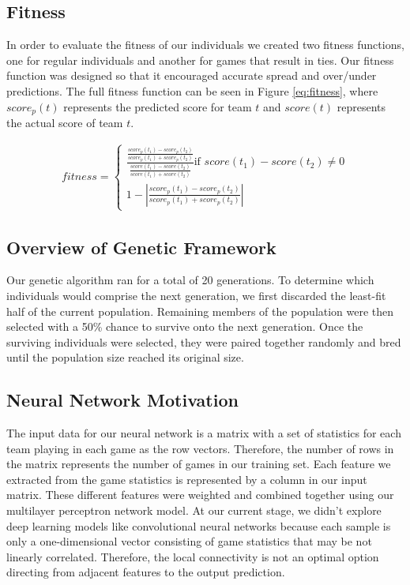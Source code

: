 \documentclass[10pt,twocolumn,letterpaper]{article}
\begin{document}
\subsection{Fitness}
In order to evaluate the fitness of our individuals we created two fitness functions, one for regular individuals and another for games that result in ties.  Our fitness function was designed so that it encouraged accurate spread and over/under predictions.  The full fitness function can be seen in Figure \ref{eq:fitness}, where $score_p(t)$ represents the predicted score for team $t$ and $score(t)$ represents the actual score of team $t$.
\begin{small}
\begin{align*}
fitness = 
\begin{cases}
\frac{\frac{score_p(t_1) - score_p(t_2)}{score_p(t_1) + score_p(t_2)}}{\frac{score(t_1) - score(t_2)}{score(t_1) + score(t_2)}}\textrm{if } score(t_1) - score(t_2) \neq 0\\
1 - \left|\frac{score_p(t_1) - score_p(t_2)}{score_p(t_1) + score_p(t_2)}\right|
\end{cases}
\end{align*}
\end{small}
\begingroup\vspace*{-\baselineskip}
\subsection{Overview of Genetic Framework}
Our genetic algorithm ran for a total of 20 generations.  To determine which individuals would comprise the next generation, we first discarded the least-fit half of the current population.  Remaining members of the population were then selected with a 50\% chance to survive onto the next generation.  Once the surviving individuals were selected, they were paired together randomly and bred until the population size reached its original size.

\subsection{Neural Network Motivation}
The input data for our neural network is a matrix with a set of statistics for each team playing in each game as the row vectors.  Therefore, the number of rows in the matrix represents the number of games in our training set.  Each feature we extracted from the game statistics is represented by a column in our input matrix. These different features were weighted and combined together using our multilayer perceptron network model.  At our current stage, we didn't explore deep learning models like convolutional neural networks because each sample is only a one-dimensional vector consisting of game statistics that may be not linearly correlated.  Therefore, the local connectivity is not an optimal option directing from adjacent features to the output prediction.
\end{document}
